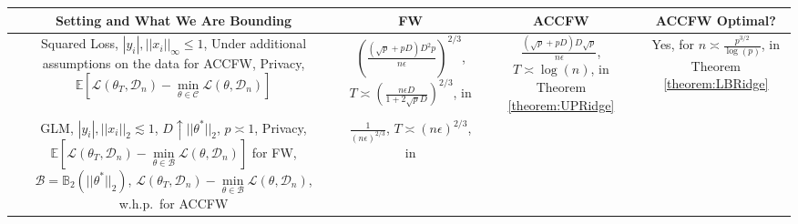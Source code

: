 \documentclass{article}
\begin{document}
\begin{table}[!htbp]
    \centering
    \small  %
    \setlength{\tabcolsep}{2.5pt}  %
    \renewcommand{\arraystretch}{1.2} %
    \begin{tabular}{|c|c|c|c|}
        \hline
        \textbf{Setting and What We Are Bounding} & \textbf{FW} & \textbf{ACCFW} & \textbf{ACCFW Optimal?}\\
        \hline
        \makecell{Squared Loss, $|y_i|, ||x_i||_\infty \leq 1$, \\ Under additional assumptions \\ on the data for ACCFW, Privacy, \\ $\mathbb{E}\left[\mathcal{L}(\theta_T, \mathcal{D}_n) - \mathop{\min}\limits_{\theta \in \mathcal{C}}\mathcal{L}(\theta, \mathcal{D}_n)\right]$} &  
        \makecell{\\$\left(\frac{(\sqrt{p} + pD)D^2p}{n\epsilon}\right)^{2/3}$, \\ \\ $T \asymp \left(\frac{n\epsilon D}{1 + 2\sqrt{p}D}\right)^{2/3}$, \\ in \cite{NOPL}} & 
        \makecell{\\$\frac{(\sqrt{p} + pD)D\sqrt{p}}{n\epsilon}$, \\ \\ $T \asymp \log(n)$, \\ in Theorem \ref{theorem:UPRidge}} & \makecell{Yes, for \\ $n \asymp \frac{p^{3/2}}{\log(p)}$, \\ in Theorem \ref{theorem:LBRidge}} \\
        \hline
        \makecell{GLM, $|y_i|, ||x_i||_2 \lesssim 1$, \\ $D \uparrow ||\theta^*||_2$, $p \asymp 1$, Privacy, \\ $\mathbb{E}\left[\mathcal{L}(\theta_T, \mathcal{D}_n) - \mathop{\min}\limits_{\theta \in \mathcal{B}}\mathcal{L}(\theta, \mathcal{D}_n)\right]$ \\ for FW, $\mathcal{B} = \mathbb{B}_2(||\theta^*||_2)$,\\ $\mathcal{L}(\theta_T, \mathcal{D}_n) - \mathop{\min}\limits_{\theta \in \mathcal{B}}\mathcal{L}(\theta, \mathcal{D}_n)$, \\ w.h.p.\ for ACCFW} & 
        \makecell{\\$\frac{1}{(n\epsilon)^{2/3}}$, \\ \\ $T \asymp \left(n\epsilon\right)^{2/3}$, \\ in \cite{NOPL}} & 

\end{tabular}
\end{table}
\end{document}
